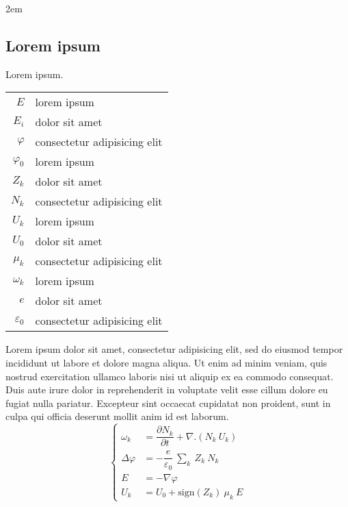 \documentclass{acmeyaptk}
\def\lorem{Lorem ipsum dolor sit amet, consectetur adipisicing elit, sed
  do eiusmod tempor incididunt ut labore et dolore magna aliqua. Ut enim
  ad minim veniam, quis nostrud exercitation ullamco laboris nisi ut
  aliquip ex ea commodo consequat. Duis aute irure dolor in
  reprehenderit in voluptate velit esse cillum dolore eu fugiat nulla
  pariatur. Excepteur sint occaecat cupidatat non proident, sunt in
  culpa qui officia deserunt mollit anim id est laborum.}
\begin{document}
\begin{colorframebox}{}

  \columnsep2em

  \begin{multicols}{2}

    \section{Lorem ipsum}

    \begin{minipage}[t]{0.35\linewidth}
      \begin{smallbox}
        \centering
        \group Lorem ipsum.

        \begin{tabular}{r@{ : }l}
          $E$             & lorem ipsum                 \\
          $E_i$           & dolor sit amet              \\
          $\varphi$       & consectetur adipisicing elit \\
          $\varphi_0$     & lorem ipsum                 \\
          $Z_k$           & dolor sit amet              \\
          $N_k$           & consectetur adipisicing elit \\
          $U_k$           & lorem ipsum                 \\
          $U_0$           & dolor sit amet              \\
          $\mu_k$         & consectetur adipisicing elit \\
          $\omega_k$      & lorem ipsum                 \\
          $e$             & dolor sit amet              \\
          $\varepsilon_0$ & consectetur adipisicing elit \\
        \end{tabular}
      \end{smallbox}
    \end{minipage}
    \hfill
    \begin{minipage}[t]{.6\linewidth}
      \lorem
      \begin{equation*}
        \left\{
          \begin{aligned}
            \omega_k       & = \dfrac{\partial N_k}{\partial t} + \nabla .(N_k\ U_k) \\
            \Delta \varphi & = - \dfrac{e}{\varepsilon_0}\ \displaystyle{\sum_k}\ Z_k\ N_k\\
            E              & = -\nabla \varphi\\
            U_k            &= U_0 + \text{sign}(Z_k)\ \mu_k\ E
          \end{aligned}
        \right.
      \end{equation*}
    \end{minipage}


\end{multicols}
\end{colorframebox}
\end{document}
